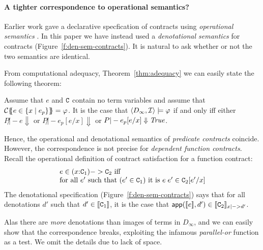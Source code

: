 
\paragraph{A tighter correspondence to operational semantics?}

Earlier work gave a declarative specfication of contracts using
\emph{operational semantics} \cite{xu+:contracts}.  In this paper we have
instead used a \emph{denotational semantics} for contracts (Figure~\ref{f:den-sem-contracts}).
It is natural to ask whether or not the two semantics are identical.

From computational adequacy, Theorem~\ref{thm:adequacy} we can easily state
the following theorem: 
\begin{corollary} Assume that $e$ and $\Ct$ contain no term variables and 
assume that $\ctrans{}{\cdot}{e \in \{x \mid e_p\}} = \formula{\phi}$. It is the case 
that $\langle D_\infty,{\cal I}\rangle \models \phi$ if and only iff either
$P \not|- e \Downarrow$ or $P \not|- e_p[e/x] \Downarrow$ or $P |- e_p[e/x] \Downarrow \True$. \end{corollary}
Hence, the operational and denotational semantics of \emph{predicate contracts} coincide.
However, the correspondence is not precise for \emph{dependent function contracts}.
Recall the operational definition of contract satisfaction for 
a function contract:
\[\begin{array}{l} 
   e \in (x{:}\Ct_1) -> \Ct_2 \text{ iff} \\
   \text{for all } e' \text{ such that } (e' \in \Ct_1) \text{ it is } e\;e' \in \Ct_2[e'/x]
\end{array}\] 
The denotational specification (Figure~\ref{f:den-sem-contracts}) 
says that for all denotations $d'$ such that
$d' \in \dbrace{\Ct_1}$, it is the case that 
$\dapp(\dbrace{e},d') \in \dbrace{\Ct_2}_{x |->d'}$. 
 
Alas there are {\em more} denotations than images of terms in $D_{\infty}$,
and we can easily show that the correspondence breaks, exploiting the infamous
{\em parallel-or} function as a test. We omit the details due to lack of space.

